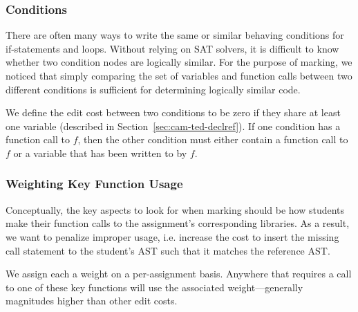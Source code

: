 \subsubsection{Conditions}

There are often many ways to write the same or similar behaving conditions for if-statements and loops. Without relying on SAT solvers, it is difficult to know whether two condition nodes are logically similar. For the purpose of marking, we noticed that simply comparing the set of variables and function calls between two different conditions is sufficient for determining logically similar code.

We define the edit cost between two conditions to be zero if they share at least one  variable (described in Section~\ref{sec:cam-ted-declref}). If one condition has a function call to $f$, then the other condition must either contain a function call to $f$ or a variable that has been written to by $f$.

\subsubsection{Weighting Key Function Usage}

Conceptually, the key aspects to look for when marking should be how students make their function calls to the assignment's corresponding libraries. As a result, we want to penalize improper usage, i.e. increase the cost to insert the missing call statement to the student's AST such that it matches the reference AST.

We assign each  a weight on a per-assignment basis. Anywhere that requires a call to one of these key functions will use the associated weight---generally magnitudes higher than other edit costs.
